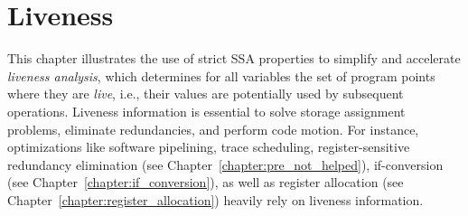 \chapter{Liveness }
\label{chapter:ssa_tells_nothing_of_liveness}
\newcommand{\name}[1]{#1}
\newcommand{\firm}{\name{LibFirm}}
\newcommand{\lao}{\name{LAO}}
\newcommand{\stm}{\name{STMicroelectronics}}
\newcommand{\Nat}{\mathbb{N}}
\newcommand{\void}[1]{ }
\newcommand{\lstart}{\textrm{start}}
\newcommand{\paper}{paper\xspace}
\newcommand{\vundef}{\Box}
\newcommand{\domzone}[1]{\mathit{dom}({#1})}
\newcommand{\sdomzone}[1]{\mathit{sdom}({#1})}
\newcommand{\prenum}[1]{\mathit{prenum}({#1})}
\newcommand{\back}[1]{\mathcal{B}_{#1}}
\newcommand{\lb}[1]{\mathbf{#1}}
\newcommand{\ldef}[1]{\mathit{def}(\var{#1})}
\newcommand{\luse}[1]{\mathit{uses}(\var{#1})}
\newcommand{\reach}[2]{{#1}\rightarrow {#2}}
\newcommand{\redreach}[2]{{#1}\rightharpoondown {#2}}
\newcommand{\red}[1]{\widetilde{#1}}
\newcommand{\BEsrc}{V^\otimes}
\newcommand{\BEtgt}{V^\odot}
\newcommand{\BE}{E^\uparrow}
\newcommand{\Tqa}{T_{(q,\var a)}}
\newcommand{\alain}[1]{{\color{red} #1}}
\newcommand{\reduced}{forward}
\newcommand{\Reduced}{Forward}
\def\Live{\textrm{Live}}
\def\LiveOut{\textrm{LiveOut}}
\def\LiveIn{\textrm{LiveIn}}
\def\PhiKill{\textrm{PhiDefs}}
\def\PhiUses{\textrm{PhiUses}}
\def\Kill{\textrm{Defs}}
\def\Exit{\textrm{Exit}}
\def\Entry{\textrm{Entry}}
\def\UpExp{\textrm{UpwardExposed}}
\def\cfgsuccs{\textrm{CFG\_succs}}
\def\union{\cup}
\def\Def{\textrm{def}}
\def\phidefedge{\texttt{phidef\_edge}}
\def\phiuseedge{\texttt{phiuse\_edge}}
\def\top{\textrm{top}}
\def\push{\textrm{push}}
\def\pop{\textrm{pop}}

This chapter illustrates the use of strict SSA properties to simplify and accelerate \emph{liveness analysis}, which determines for all variables the set of program points where they are \emph{live}, i.e., their values are potentially used by subsequent operations.
Liveness information is essential to solve storage assignment problems, eliminate redundancies, and perform code motion.
For instance, optimizations like software pipelining, trace scheduling, register-sensitive redundancy elimination (see Chapter~\ref{chapter:pre_not_helped}), if-conversion (see Chapter~\ref{chapter:if_conversion}), as well as register allocation (see Chapter~\ref{chapter:register_allocation}) heavily rely on liveness information.

